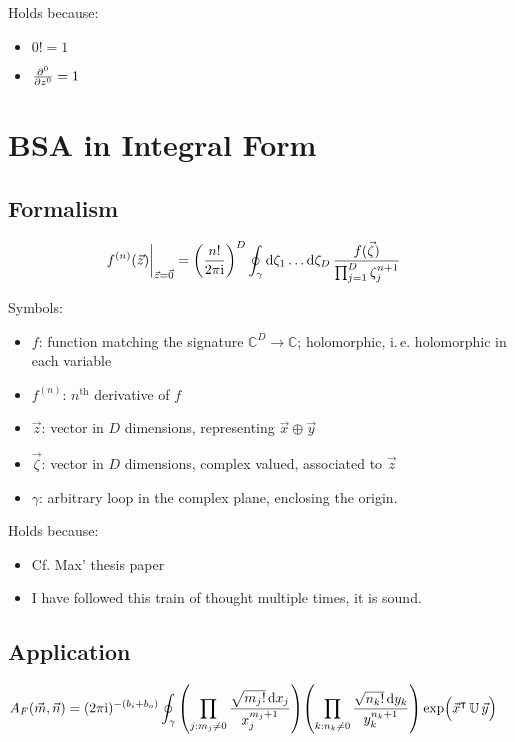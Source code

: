 \documentclass[
	english,
	a4paper,
	fontsize=10pt,
	parskip=half,
	titlepage=true,
	DIV=12,
	final
]{scrreprt}
\newcommand*{\ie}{i.\,e.\xspace}
\newcommand*{\thus}{\ensuremath{\rightarrow}\xspace}
\newcommand*{\transp}{\ensuremath{^\intercal}}
\newcommand*{\iunit}{\ensuremath{\mathrm{i}}}
\newcommand*{\setComplex}  {\ensuremath{\mathbb{C}}}
\begin{document}
Holds because:
\begin{itemize}
\item $0! = 1$
\item $\pdv[0]{z} = 1$
\end{itemize}

\section{BSA in Integral Form}
\subsection{Formalism}
\begin{align}
	\eval{ f^{(n)}(\vec{z}) }_{\vec{z} = \vec{0}}
&=
	\qty(
		\frac{n!}{2\pi \iunit}
	)^{D}
	\oint_{\gamma} \dd{\zeta_1} \ldots \dd{\zeta_D}
		\frac
			{f(\vec{\zeta})}
			{\prod_{j=1}^{D} \zeta_j^{n+1}}
\end{align}

Symbols:
\begin{itemize}
\item $f$: function matching the signature $\setComplex^{D} \thus \setComplex$; holomorphic, \ie holomorphic in each variable
\item $f^{(n)}$: $n^{\text{th}}$ derivative of $f$
\item $\vec{z}$: vector in $D$ dimensions, representing $\vec{x} \oplus \vec{y}$
\item $\vec{\zeta}$: vector in $D$ dimensions, complex valued, associated to $\vec{z}$
\item $\gamma$: arbitrary loop in the complex plane, enclosing the origin.
\end{itemize}

Holds because:
\begin{itemize}
\item Cf. Max' thesis paper
\item I have followed this train of thought multiple times, it is sound.
\end{itemize}

\subsection{Application}
\begin{align}
	A_F(\vec{m}, \vec{n})
&=
	(2\pi\iunit)^{-(b_i + b_o)}
	\oint_{\gamma}
		\qty( \prod_{j : m_j \neq 0}
			\frac
				{\sqrt{m_j!} \dd{x_j}}
				{x_j^{m_j+1}}
		)
		\qty( \prod_{k : n_k \neq 0}
			\frac
				{\sqrt{n_k!} \dd{y_k}}
				{ y_k^{n_k+1} }
		)
		\exp( \Big. \vec{x}\transp \, \mathbb{U} \, \vec{y})
	\label{eqn:BSA_Int_BZO}
\end{align}
\end{document}
